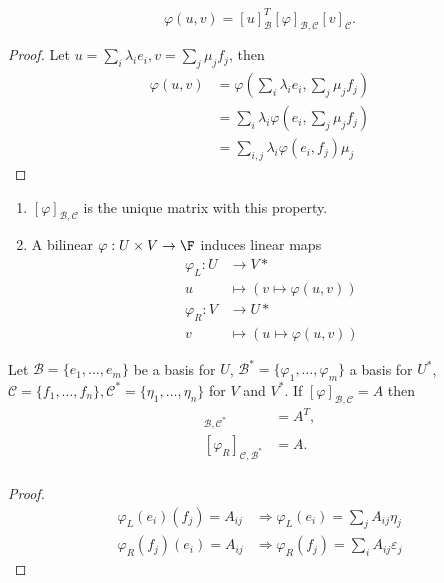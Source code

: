 \documentclass[a4paper]{article}
\newcommand*{\basis}{\mathcal}
\theoremstyle{definition}
\begin{document}
\begin{lemma}
  \[
    \varphi(u, v) = [u]_{\basis B}^T [\varphi]_{\basis B, \basis C} [v]_{\basis C}.
  \]
\end{lemma}

\begin{proof}
  Let \(u = \sum_{i}^{ }\lambda_ie_i, v = \sum_{j}^{} \mu_jf_j\), then
  \begin{align*}
    \varphi(u, v) &= \varphi\left( \sum_{i}^{ }\lambda_ie_i, \sum_{j}^{} \mu_jf_j \right) \\
                  &= \sum_{i}^{ }\lambda_i \varphi\left(e_i, \sum_{j}^{} \mu_jf_j \right)\\
                  &= \sum_{i, j}^{ }\lambda_i \varphi(e_i, f_j) \mu_j
  \end{align*}
\end{proof}

\begin{note}\leavevmode
  \begin{enumerate}
  \item \([\varphi]_{\basis B, \basis C}\) is the unique matrix with this property.
  \item A bilinear \(\varphi: U \times V \to \F\) induces linear maps
    \begin{align*}
      \varphi_L: U &\to V* \\
      u &\mapsto (v \mapsto \varphi(u, v)) \\
      \varphi_R: V &\to U* \\
      v &\mapsto (u \mapsto \varphi(u, v))
    \end{align*}
  \end{enumerate}
\end{note}

\begin{lemma}
  Let \(\basis B = \{e_1,\dots, e_m\}\) be a basis for \(U\), \(\basis B^* = \{\varphi_1,\dots, \varphi_m\}\) a basis for \(U^*\), \(\basis C = \{f_1,\dots, f_n\}, \basis C^* = \{\eta_1,\dots, \eta_n\}\) for \(V\) and \(V^*\). If \([\varphi]_{\basis B, \basis C} = A\) then
  \begin{align*}
    [\varphi_L]_{\basis B, \basis C^*} &= A^T, \\
    [\varphi_R]_{\basis C, \basis B^*} &= A. \\
  \end{align*}
\end{lemma}

\begin{proof}
  \begin{align*}
    \varphi_L(e_i)(f_j) = A_{ij} &\Longrightarrow \varphi_L(e_i) = \sum_{j}^{ }A_{ij}\eta_j \\
    \varphi_R(f_j)(e_i) = A_{ij} &\Longrightarrow \varphi_R(f_j) = \sum_{i}^{ }A_{ij}\varepsilon_j
  \end{align*}
\end{proof}
\end{document}
